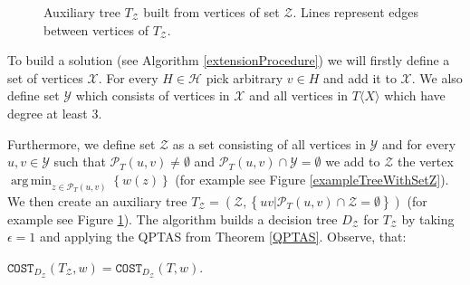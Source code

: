 \documentclass[a4paper, anonymous, numberwithinsect, pdfa, UKenglish,cleveref, autoref, thm-restate]{socg-lipics-v2021}
\newcommand{\br}[1]{\left( #1 \right)}
\newcommand{\brc}[1]{\left\{ #1 \right\}}
\newcommand{\angl}[1]{\langle #1 \rangle}
\newcommand{\COST}{\texttt{COST}}
\newcommand{\argmin}{\operatorname*{arg\,min}}
\begin{document}
\begin{figure}[htp]
\begin{minipage}[t]{0.47\textwidth}
    \caption{Auxiliary tree $T_{\mathcal{Z}}$ built from vertices of set $\mathcal{Z}$. Lines represent edges between vertices of $T_{\mathcal{Z}}$.}\label{exampleAuxTreeTZ}
\end{minipage}
\end{figure}

To build a solution (see Algorithm \ref{extensionProcedure}) we will firstly define a set of vertices $\mathcal{X}$. For every $H\in\mathcal{H}$ pick arbitrary $v\in H$ and add it to $\mathcal{X}$. We also define set $\mathcal{Y}$ which consists of vertices in $\mathcal{X}$ and all vertices in $T\angl{X}$ which have degree at least 3. 

Furthermore, we define set $\mathcal{Z}$ as a set consisting of all vertices in $\mathcal{Y}$ and for every $u,v\in \mathcal{Y}$ such that $\mathcal{P}_{T}\br{u, v}\neq\emptyset$ and $\mathcal{P}_{T}\br{u, v}\cap \mathcal{Y}=\emptyset$ we add to $\mathcal{Z}$ the vertex $\argmin_{z\in \mathcal{P}_{T}\br{u, v}}\brc{w\br{z}}$ (for example see Figure \ref{exampleTreeWithSetZ}). We then create an auxiliary tree $T_{\mathcal{Z}}=\br{\mathcal{Z},\brc{uv|\mathcal{P}_{T}\br{u, v}\cap \mathcal{Z}=\emptyset}}$ (for example see Figure \ref{exampleAuxTreeTZ}). The algorithm builds a decision tree $D_{\mathcal{Z}}$ for $T_{\mathcal{Z}}$ by taking $\epsilon=1$ and applying the QPTAS from Theorem \ref{QPTAS}. Observe, that:
\begin{observation}\label{CostDZinTObservation}
    $\COST_{D_{\mathcal{Z}}}\br{T_{\mathcal{Z}}, w}=\COST_{D_{\mathcal{Z}}}\br{T, w}$.
\end{observation}
\end{document}
